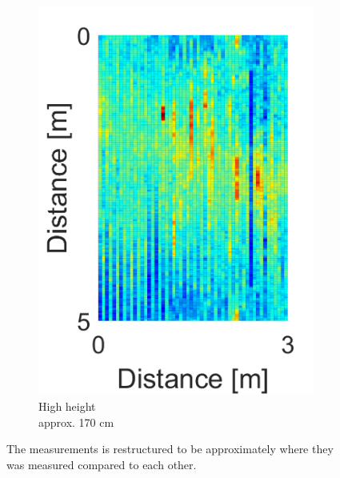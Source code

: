 \begin{minipage}{0.9\textwidth}
\begin{figure}[H]
\begin{subfigure}[b]{0.326\textwidth}
\includegraphics[width=\textwidth]{figures/Not_Norm_space_3.png}
\caption{High height \\ approx. 170 cm}
\label{Not_norm_high}
\end{subfigure}
\caption{The measurements is restructured to be approximately where they was measured compared to each other.}
\label{fig:Not_norm_space}
\end{figure}
\end{minipage}%
